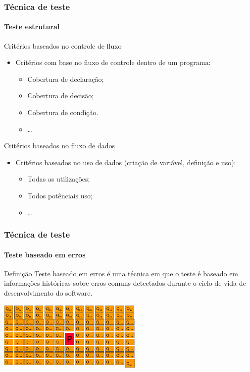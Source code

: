 \begin{frame}
\frametitle{Técnica de teste}
\framesubtitle{Teste estrutural}
\label{concept:structural-testing-criteria}

\begin{block:fact}{Critérios baseados no controle de fluxo}
\begin{itemize}
	\item Critérios com base no fluxo de controle dentro de um programa:
	\begin{itemize}
		\item Cobertura de declaração;
		\item Cobertura de decisão;
		\item Cobertura de condição.
		\item \ldots
	\end{itemize}
\end{itemize}
\end{block:fact}


\begin{block:fact}{Critérios baseados no fluxo de dados}
\begin{itemize}
	\item Critérios baseados no uso de dados (criação de variável, definição e uso):
	\begin{itemize}
		\item Todas as utilizações;
		\item Todos potênciais uso;
		\item \ldots
	\end{itemize}
\end{itemize}
\end{block:fact}


\hfill
{}
\end{frame}




\begin{frame}
\frametitle{Técnica de teste}
\framesubtitle{Teste baseado em erros}
\label{concept:fault-based-testing}

\begin{block:concept}{Definição}
Teste baseado em erros é uma técnica em que o teste é baseado em informações históricas sobre erros comuns detectados durante o ciclo de vida de desenvolvimento do software. 
\end{block:concept}

\begin{block:fact}{}
    \centering
    \includegraphics[width=7cm]{teste-de-software/conceitos-basicos/Imagens/mutation-testing}
\end{block:fact}
\end{frame}


